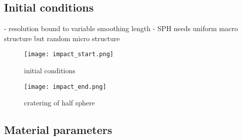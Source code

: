 \subsection{Initial conditions}
- resolution bound to variable smoothing length
- SPH needs uniform macro structure but random micro structure

\begin{figure}[H]
    \centering
    \texttt{[image: impact\_start.png]}
    \caption{initial conditions}
    \label{fig:impact_start}
\end{figure}

\begin{figure}[H]
    \centering
    \texttt{[image: impact\_end.png]}
    \caption{cratering of half sphere}
    \label{fig:impact_end}
\end{figure}

\subsection{Material parameters}

